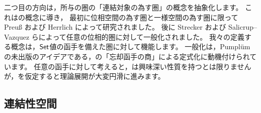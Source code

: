 二つ目の方向は，所与の圏の「連結対象の為す圏」の概念を抽象化します。
これは\WordComponentCategory の概念に導き，
最初に位相空間の為す圏と一様空間の為す圏に限って Preu\ss\cite{preuss--1967} および Herrlich\cite{herrlich--1968} によって研究されました。
後に Strecker\cite{strecker--1974} および Salicrup--Vazquez\cite{salicrup_vazquez--1972} らによって任意の位相的圏に対して一般化されました。
我々の定義する概念は，\(\mathsf{Set}\)値の函手を備えた圏に対して機能します。
一般化は，Pumpl\"{u}m の未出版のアイデアである，\WordComponentCategory の「忘却函手の商」による定式化に動機付けられています。
任意の函手に対して考えると，\WordComponentCategory は興味深い性質を持つとは限りませんが，\WordMonoFibration を仮定すると理論展開が大変円滑に進みます。

\subsection{連結性空間}

